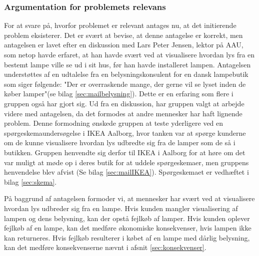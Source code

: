 \subsubsection{Argumentation for problemets relevans}
\label{sec:hvorfor_relavant}
For at svare på, hvorfor problemet er relevant antages nu, at det initierende problem eksisterer. Det er svært at bevise, at denne antagelse er korrekt, men antagelsen er lavet efter en diskussion med Lars Peter Jensen, lektor på AAU, som netop havde erfaret, at han havde svært ved at visualisere hvordan lys fra en bestemt lampe ville se ud i sit hus, før han havde installeret lampen. Antagelsen understøttes af en udtalelse fra en belysningskonsulent for en dansk lampebutik som siger følgende: "Der er overraskende mange, der gerne vil se lyset inden de køber lamper"(se bilag \ref{sec:mailbelysning}). Dette er en erfaring som flere i gruppen også har gjort sig. Ud fra en diskussion, har gruppen valgt at arbejde videre med antagelsen, da det formodes at andre mennesker har haft lignende problem. Denne formodning ønskede gruppen at teste yderligere ved en spørgeskemaundersøgelse i IKEA Aalborg, hvor tanken var at spørge kunderne om de kunne visualisere hvordan lys udbredte sig fra de lamper som de så i butikken. Gruppen henvendte sig derfor til IKEA i Aalborg for at høre om det var muligt at møde op i deres butik for at uddele spørgeskemaer, men gruppens henvendelse blev afvist (Se bilag \ref{sec:mailIKEA}). Spørgeskemaet er vedhæftet i bilag \ref{sec:skema}.

På baggrund af antagelsen formoder vi, at mennesker har svært ved at visualisere hvordan lys udbreder sig fra en lampe. Hvis kunden mangler visualisering af lampen og dens belysning, kan der opstå fejlkøb af lamper. Hvis kunden oplever fejlkøb af en lampe, kan det medføre økonomiske konsekvenser, hvis lampen ikke kan returneres. Hvis fejlkøb resulterer i købet af en lampe med dårlig belysning, kan det medføre konsekvenserne nævnt i afsnit \ref{sec:konsekvenser}.